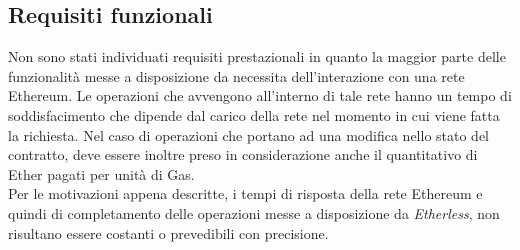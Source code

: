 \subsection{Requisiti funzionali}
Non sono stati individuati requisiti prestazionali in quanto la maggior parte delle funzionalità messe a disposizione da  necessita dell'interazione con una rete Ethereum. Le operazioni che avvengono all'interno di tale rete hanno un tempo di soddisfacimento che dipende dal carico della rete nel momento in cui viene fatta la richiesta. Nel caso di operazioni che portano ad una modifica nello stato del contratto, deve essere inoltre preso in considerazione anche il quantitativo di Ether pagati per unità di Gas. \\ 
Per le motivazioni appena descritte, i tempi di risposta della rete Ethereum e quindi di completamento delle operazioni messe a disposizione da \textit{Etherless}, non risultano essere costanti o prevedibili con precisione. 